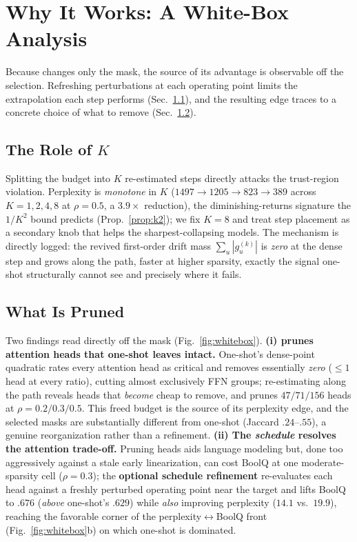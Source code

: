 \section{Why It Works: A White-Box Analysis}
\label{sec:analysis}
Because \method changes only the mask, the source of its advantage is observable off the selection. Refreshing perturbations at each operating point limits the extrapolation each step performs (Sec.~\ref{sec:continuation}), and the resulting edge traces to a concrete choice of what to remove (Sec.~\ref{sec:whitebox}).

\subsection{The Role of $K$}
\label{sec:continuation}
Splitting the budget into $K$ re-estimated steps directly attacks the trust-region violation.
Perplexity is \emph{monotone} in $K$ ($1497\!\to\!1205\!\to\!823\!\to\!389$ across $K{=}1,2,4,8$ at $\rho{=}0.5$, a $3.9\times$ reduction), the diminishing-returns signature the $1/K^2$ bound predicts (Prop.~\ref{prop:k2}); we fix $K{=}8$ and treat step placement as a secondary knob that helps the sharpest-collapsing models.
The mechanism is directly logged: the revived first-order drift mass $\sum_u|g^{(k)}_u|$ is \emph{zero} at the dense step and grows along the path, faster at higher sparsity, exactly the signal one-shot structurally cannot see and precisely where it fails.

\subsection{What Is Pruned}
\label{sec:whitebox}
Two findings read directly off the mask (Fig.~\ref{fig:whitebox}). \textbf{(i)
\method prunes attention heads that one-shot leaves intact.} One-shot's dense-point quadratic rates every
attention head as critical and removes essentially \emph{zero} ($\le1$ head at every ratio), cutting almost
exclusively FFN groups; re-estimating along the path reveals heads that \emph{become} cheap to remove, and \method
prunes $47/71/156$ heads at $\rho{=}0.2/0.3/0.5$. This freed budget is the source of its perplexity edge,
and the selected masks are substantially different from one-shot (Jaccard $.24$--$.55$), a genuine reorganization rather than a refinement. \textbf{(ii) The
\emph{schedule} resolves the attention trade-off.} Pruning heads aids language modeling but, done too aggressively against a stale early linearization, can cost BoolQ at one moderate-sparsity cell ($\rho{=}0.3$); the \textbf{optional schedule refinement} re-evaluates each head against a freshly perturbed operating point near the target and lifts BoolQ to $\mathbf{.676}$ (\emph{above} one-shot's $.629$) while \emph{also} improving perplexity ($14.1$ vs.\ $19.9$), reaching the favorable corner of the perplexity$\leftrightarrow$BoolQ front (Fig.~\ref{fig:whitebox}b) on which one-shot is dominated.

